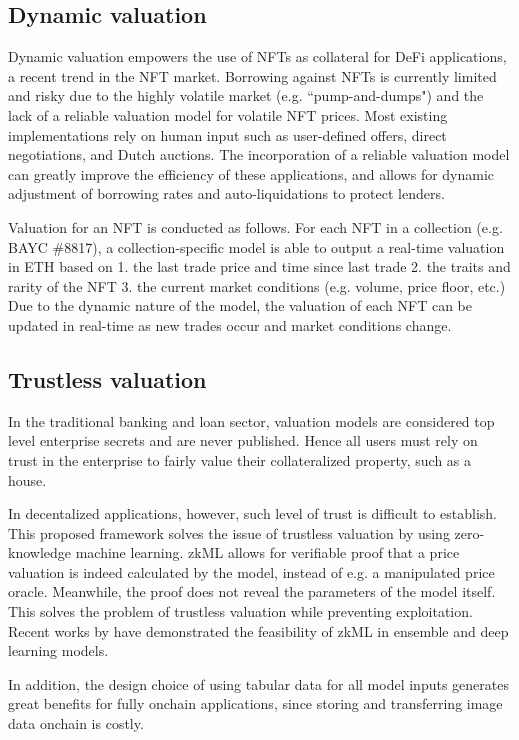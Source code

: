 \documentclass[12pt]{article}
\begin{document}
\subsection{Dynamic valuation}
Dynamic valuation empowers the use of NFTs as collateral for DeFi applications, a recent trend in the NFT market. Borrowing against NFTs is currently limited and risky due to the highly volatile market (e.g. ``pump-and-dumps") and the lack of a reliable valuation model for volatile NFT prices. Most existing implementations rely on human input such as user-defined offers, direct negotiations, and Dutch auctions. The incorporation of a reliable valuation model can greatly improve the efficiency of these applications, and allows for dynamic adjustment of borrowing rates and auto-liquidations to protect lenders.

Valuation for an NFT is conducted as follows. For each NFT in a collection (e.g. BAYC \#8817), a collection-specific model is able to output a real-time valuation in ETH based on 1. the last trade price and time since last trade 2. the traits and rarity of the NFT 3. the current market conditions (e.g. volume, price floor, etc.) Due to the dynamic nature of the model, the valuation of each NFT can be updated in real-time as new trades occur and market conditions change.

\subsection{Trustless valuation}
In the traditional banking and loan sector, valuation models are considered top level enterprise secrets and are never published. Hence all users must rely on trust in the enterprise to fairly value their collateralized property, such as a house. 

In decentalized applications, however, such level of trust is difficult to establish. This proposed framework solves the issue of trustless valuation by using zero-knowledge machine learning. zkML allows for verifiable proof that a price valuation is indeed calculated by the model, instead of e.g. a manipulated price oracle. Meanwhile, the proof does not reveal the parameters of the model itself. This solves the problem of trustless valuation while preventing exploitation. Recent works by \citet{liu2021zkcnn,zhang2020zero} have demonstrated the feasibility of zkML in ensemble and deep learning models. 

In addition, the design choice of using tabular data for all model inputs generates great benefits for fully onchain applications, since storing and transferring image data onchain is costly.
\end{document}
